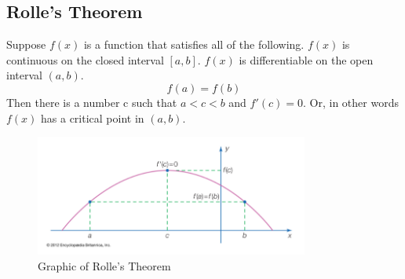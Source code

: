 \documentclass{article}
\newcommand{\comment}[1]{}
\begin{document}
    \comment{
    \section*{Rolle's Thorem}
    Let $f$ be a continuous function on $[a, b]$ and differentiable on $]a, b[$ such that $f(a) = f(b)$. Then there exists $c \in ]a, b[ $ such that $f'(c) = 0$.

    This theorem will be admitted because its proof requires results which are not seen in this course. If $f$ is the constant function, the result is obvious. Otherwise, since $f$ is continuous over $[a, b]$, $f$ is bounded over $[a, b]$
    and reaches its bounds. This means that there exists $m \in  [a, b] $ and $M \in  [a, b] $ such that $\forall x \in  [a, b]$, $f(m) \leqslant  f(x) \leqslant f(M) (f(m) \neq  f(M)$ because $f$ is not a constant function$)$. As $f(a) = f(b)$, then we have the following cases:

    \begin{enumerate}
        \item if $m = a$ or $m = b$, then $M \in  ]a, b[$, hence we have $c = M$;
        \item if $M = a$ or $M = b$, then $m \in  ]a, b[$, hence we have $c = m$;
        \item $m \in  ]a, b[$ and $M \in  ]a, b[$, hence we have $c = m$ or $c = M$.
    \end{enumerate}

    So in all cases $f$ admits a local extremum at a point $c$ of $]a, b[$ and is differentiable on $]a, b[$, hence, according to the proposition 22, $f'(c) = 0$.
    \section*{Hint}
    Use $g : x \rightarrow  e^ {\alpha x} $
    }

    \subsection{Rolle's Theorem}
    Suppose $f(x)$ is a function that satisfies all of the following.
    $f(x)$ is continuous on the closed interval $[a,b]$.
    $f(x)$ is differentiable on the open interval $(a,b)$.
    $$f(a) = f(b)$$
    Then there is a number c such that $a<c<b$ and $f'(c)=0$. Or, in other words $f(x)$ has a critical point in $(a,b)$.

    \begin{figure}[H]
        \centering
        \includegraphics[width=340px]{img/rollestheorem.png}
        \caption{Graphic of Rolle's Theorem}
    \end{figure}
\end{document}
